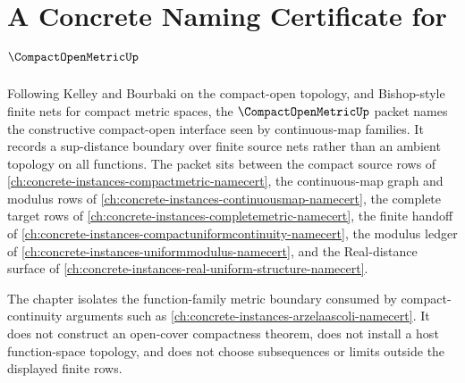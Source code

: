 \chapter{A Concrete Naming Certificate for $\CompactOpenMetricUp$}
\label{ch:concrete-instances-compact-open-metric-namecert}

Following Kelley and Bourbaki on the compact-open topology, and Bishop-style finite nets for compact metric spaces, the $\CompactOpenMetricUp$ packet names the constructive compact-open interface seen by continuous-map families. It records a sup-distance boundary over finite source nets rather than an ambient topology on all functions. The packet sits between the compact source rows of \autoref{ch:concrete-instances-compactmetric-namecert}, the continuous-map graph and modulus rows of \autoref{ch:concrete-instances-continuousmap-namecert}, the complete target rows of \autoref{ch:concrete-instances-completemetric-namecert}, the finite handoff of \autoref{ch:concrete-instances-compactuniformcontinuity-namecert}, the modulus ledger of \autoref{ch:concrete-instances-uniformmodulus-namecert}, and the Real-distance surface of \autoref{ch:concrete-instances-real-uniform-structure-namecert}.

The chapter isolates the function-family metric boundary consumed by compact-continuity arguments such as \autoref{ch:concrete-instances-arzelaascoli-namecert}. It does not construct an open-cover compactness theorem, does not install a host function-space topology, and does not choose subsequences or limits outside the displayed finite rows.

